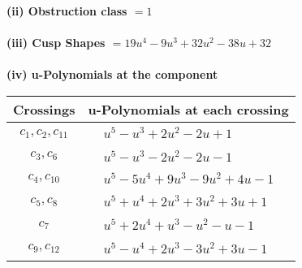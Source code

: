 \documentclass[1p]{elsarticle_modified}
\theoremstyle{definition}
\begin{document}
\flushleft \textbf{(ii) Obstruction class $= 1$}\\~\\
\flushleft \textbf{(iii) Cusp Shapes $= 19 u^4-9 u^3+32 u^2-38 u+32$}\\~\\
\newpage\renewcommand{\arraystretch}{1}
\flushleft \textbf{(iv) u-Polynomials at the component}\newline \\
\begin{tabular}{m{50pt}|m{274pt}}
Crossings & \hspace{64pt}u-Polynomials at each crossing \\
\hline $$\begin{aligned}c_{1},c_{2},c_{11}\end{aligned}$$&$\begin{aligned}
&u^5- u^3+2 u^2-2 u+1
\end{aligned}$\\
\hline $$\begin{aligned}c_{3},c_{6}\end{aligned}$$&$\begin{aligned}
&u^5- u^3-2 u^2-2 u-1
\end{aligned}$\\
\hline $$\begin{aligned}c_{4},c_{10}\end{aligned}$$&$\begin{aligned}
&u^5-5 u^4+9 u^3-9 u^2+4 u-1
\end{aligned}$\\
\hline $$\begin{aligned}c_{5},c_{8}\end{aligned}$$&$\begin{aligned}
&u^5+u^4+2 u^3+3 u^2+3 u+1
\end{aligned}$\\
\hline $$\begin{aligned}c_{7}\end{aligned}$$&$\begin{aligned}
&u^5+2 u^4+u^3- u^2- u-1
\end{aligned}$\\
\hline $$\begin{aligned}c_{9},c_{12}\end{aligned}$$&$\begin{aligned}
&u^5- u^4+2 u^3-3 u^2+3 u-1
\end{aligned}$\\
\hline
\end{tabular}\\~\\
\end{document}
